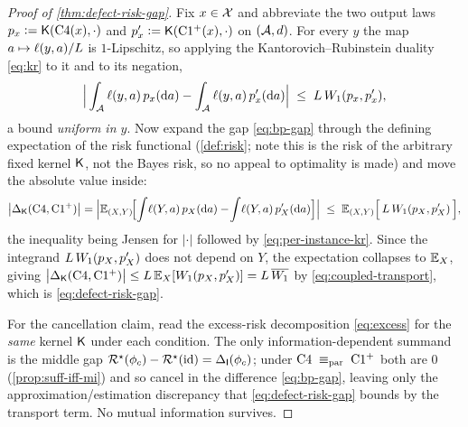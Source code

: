 \begin{proof}[Proof of \cref{thm:defect-risk-gap}]
Fix $x\in\mathcal{X}$ and abbreviate the two output laws
$p_x\vcentcolon=\mathsf{K}(\mathrm{C}4(x),\cdot)$ and
$p'_x\vcentcolon=\mathsf{K}(\mathrm{C1^{+}}(x),\cdot)$ on $(\mathcal{A},d)$. For every $y$ the
map $a\mapsto\ell(y,a)/L$ is $1$-Lipschitz, so applying the
Kantorovich--Rubinstein duality \eqref{eq:kr} to it and to its negation,
\begin{equation}
  \label{eq:per-instance-kr}
  \Big|\int_{\mathcal{A}}\ell(y,a)\,p_x(\mathrm{d}a)
       -\int_{\mathcal{A}}\ell(y,a)\,p'_x(\mathrm{d}a)\Big|
  \;\le\; L\,W_{1}(p_x,p'_x),
\end{equation}
a bound \emph{uniform in $y$}. Now expand the gap \eqref{eq:bp-gap} through the
defining expectation of the risk functional (\cref{def:risk}; note this is the
risk of the arbitrary fixed kernel $\mathsf{K}$, not the Bayes risk, so no
appeal to optimality is made) and move the absolute value inside:
\[
  \big|\Delta_{\mathsf{K}}(\mathrm{C}4,\mathrm{C1^{+}})\big|
  = \Big|\mathbb{E}_{(X,Y)}\!\Big[\!\int\!\ell(Y,a)\,p_X(\mathrm{d}a)
        -\!\int\!\ell(Y,a)\,p'_X(\mathrm{d}a)\Big]\Big|
  \;\le\; \mathbb{E}_{(X,Y)}\Big[\,L\,W_{1}(p_X,p'_X)\,\Big],
\]
the inequality being Jensen for $|\cdot|$ followed by \eqref{eq:per-instance-kr}.
Since the integrand $L\,W_{1}(p_X,p'_X)$ does not depend on $Y$, the
expectation collapses to $\mathbb{E}_X$, giving
$\big|\Delta_{\mathsf{K}}(\mathrm{C}4,\mathrm{C1^{+}})\big|\le
L\,\mathbb{E}_X[W_{1}(p_X,p'_X)]=L\,\overline{W_{1}}$ by
\eqref{eq:coupled-transport}, which is \eqref{eq:defect-risk-gap}.

For the cancellation claim, read the excess-risk decomposition \eqref{eq:excess}
for the \emph{same} kernel $\mathsf{K}$ under each condition. The only
information-dependent summand is the middle gap
$\mathcal{R}^{\star}(\phi_c)-\mathcal{R}^{\star}(\mathrm{id})=\Delta_{\mathsf{I}}\!\left(\phi_c\right)$; under
$\mathrm{C}4\;\equiv_{\mathrm{par}}\;\mathrm{C1^{+}}$ both are $0$ (\cref{prop:suff-iff-mi}) and so
cancel in the difference \eqref{eq:bp-gap}, leaving only the
approximation/estimation discrepancy that \eqref{eq:defect-risk-gap} bounds by the
transport term. No mutual information survives.
\end{proof}

